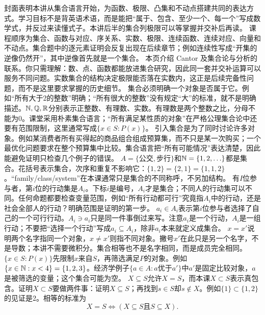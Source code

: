 封面表明本讲从集合语言开始，为函数、极限、凸集和不动点搭建共同的表达方式。学习目标不是背英语术语，而是能把“属于、包含、至少一个、每一个”写成数学式，并反过来读懂式子。本讲后半的集合列极限可以等掌握并交补后再读。
课程顺序为集合、函数与对应、序关系、实数、极限、连续函数、连续对应、向量和不动点。集合题中的逐元素证明会反复出现在后续章节；例如连续性写成“开集的逆像仍然开”，其中逆像首先就是一个集合。
本页介绍 Cantor 及集合论与分析的联系。你只需理解：数、点、函数都能放进集合研究，因此同一套并交补运算可以服务不同问题。实数集合的结构决定极限能否落在实数内，这正是后续完备性问题，而不是这里要求掌握的历史细节。
集合必须明确一个对象是否属于它。例如“所有大于2的整数”明确；“所有很大的整数”没有规定“大”的标准，就不是明确描述。$\mathbb{N},\mathbb{Q},\mathbb{R}$分别表示正整数、有理数、实数。有理数是两个整数之比，分母不能为0。课堂采用朴素集合语言；“所有满足某性质的对象”在严格公理集合论中还要有范围限制，这里通常写成$\{x\in S:P(x)\}$。
引入集合是为了同时讨论许多对象。例如某消费者所有买得起的商品组合组成预算集，而不只是某一次购买；一个最优化问题要求在整个预算集中比较。集合语言把“所有可能情况”表达清楚，因此能避免证明只检查几个例子的错误。
$A=\{\text{公交},\text{步行}\}$和$\mathbb{N}=\{1,2,\ldots\}$都是集合。花括号表示集合，次序和重复不影响它：$\{1,2\}=\{2,1\}=\{1,1,2\}$。“family/class/system”在本课通常只是集合的不同称呼，不另加结构。
有$I$位参与者，第$i$位的行动集是$A_i$。下标$i$是编号，$A_i$才是集合；不同人的行动集可以不同。任何命题都要检查变量范围，例如“所有行动都可行”究竟指$A_i$中的行动，还是社会全部人的行动？明确范围是证明的第一步。
$a_i\in A_i$表示第$i$位参与者选择了自己的一个可行行动。$A_i\ni a_i$只是同一件事倒过来写。注意$a_i$是一个行动，$A_i$是一组行动；不要把“选择一个行动”写成$a_i\subseteq A_i$，除非$a_i$本来就定义成集合。
$x=x'$说明两个名字指同一个对象，$x\ne x'$则指不同对象。撇号$x'$在此只是另一个名字，不是导数；本讲不需要微积分。集合相等也不是名字相同，而是成员完全相同。
$\{x\in S:P(x)\}$先限制$x$来自$S$，再筛选满足$P$的对象。例如$\{x\in\mathbb{N}:x<4\}=\{1,2,3\}$。经济学例子$\{a\in A:a\text{优于}a'\}$中$a'$是固定比较对象，$a$是被筛选的变量；这个集合可能为空。
$X\subseteq S$允许$X=S$，而本课$X\subset S$表示真包含。证明$X\subset S$要做两件事：证明$X\subseteq S$；再找到$s\in S$却$s\notin X$。例如$\{1\}\subset\{1,2\}$的见证是2。相等的标准为
\[X=S\iff(X\subseteq S\text{且}S\subseteq X).\]
